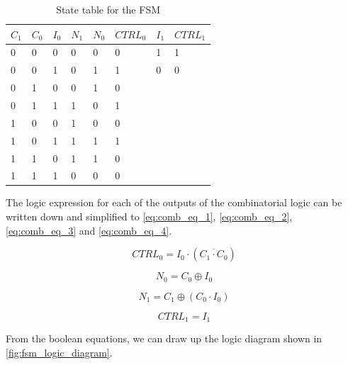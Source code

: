\begin{table}[H]
\caption{State table for the FSM}
\label{tab:state_table}
\centering
\begin{tabular}{|l|l|l|l|l|l||l|l|}
\hline
\rowcolor[HTML]{C0C0C0} 
$C_1$ & $C_0$ & $I_0$ & $N_1$ & $N_0$ & $CTRL_0$ & $I_1$ & $CTRL_1$\\
\hline
0  & 0  & 0  & 0   & 0   & 0 & 1 & 1\\ 
\hline
0  & 0  & 1  & 0   & 1   & 1 & 0 & 0\\ 
\hline
0  & 1  & 0  & 0   & 1   & 0 \\ 
\cline{1-6}
0  & 1  & 1  & 1   & 0   & 1 \\ 
\cline{1-6}
1  & 0  & 0  & 1   & 0   & 0 \\ 
\cline{1-6}
1  & 0  & 1  & 1   & 1   & 1 \\ 
\cline{1-6}
1  & 1  & 0  & 1   & 1   & 0 \\ 
\cline{1-6}
1  & 1  & 1  & 0   & 0   & 0 \\ 
\cline{1-6}

\end{tabular}
\end{table}

\noindent
The logic expression for each of the outputs of the combinatorial logic can be written down and simplified to \autoref{eq:comb_eq_1}, \ref{eq:comb_eq_2}, \ref{eq:comb_eq_3} and \ref{eq:comb_eq_4}.

\begin{equation}
\label{eq:comb_eq_1}
    CTRL_0 = I_0\cdot(\overline{C_1 \cdot C_0})
\end{equation}

\begin{equation}
\label{eq:comb_eq_2}
    N_0 = C_0 \oplus I_0
\end{equation}

\begin{equation}
\label{eq:comb_eq_3}
    N_1 = C_1 \oplus (C_0 \cdot I_0)
\end{equation}

\begin{equation}
\label{eq:comb_eq_4}
    CTRL_1 = I_1
\end{equation}

From the boolean equations, we can draw up the logic diagram shown in \autoref{fig:fsm_logic_diagram}.

